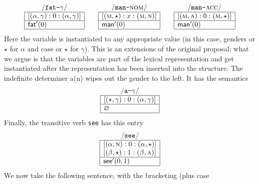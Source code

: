 $$
\begin{array}{|l|}
\multicolumn{1}{c}{/\mbox{\tt fat-}\gamma/} \\
\hline
\left[ \spr{\alpha}{\gamma} : 0 : \spr{\alpha}{\gamma}\right]
\\\hline
\mbox{\sf fat}'(0) \\\hline
\end{array} \qquad
\begin{array}{|l|}
\multicolumn{1}{c}{/\mbox{\tt man-}\mbox{\sc nom}/} \\
\hline
\left[ \spr{\ms}{\star} : x : \spr{\ms}{\nm}\right]
\\\hline
\mbox{\sf man}'(0) \\\hline
\end{array} \qquad
\begin{array}{|l|}
\multicolumn{1}{c}{/\mbox{\tt man-}\mbox{\sc acc}/} \\
\hline
\left[ \spr{\ms}{\ac} : 0 : \spr{\ms}{\star}\right]
\\\hline
\mbox{\sf man}'(0) \\\hline
\end{array}$$
Here the variable is instantiated to any appropriate value
(in this case, genders or $\star$ for $\alpha$ and case or
$\star$ for $\gamma$). This is an extensions of the original
proposal; what we argue is that the variables are part of the
lexical representation and get instantiated after the representation
has been inserted into the structure. The indefinite determiner
{\sf a(n)} wipes out the gender to the left. It has the
semantics
$$\begin{array}{|l|}
\multicolumn{1}{c}{/\mbox{\tt a-}\gamma/} \\
\hline
\left[ \spr{\star}{\gamma} : 0 : \spr{\alpha}{\gamma}\right]
\\\hline
\varnothing \\\hline
\end{array}$$
Finally, the transitive verb {\tt see} has this entry
$$\begin{array}{|l|}
\multicolumn{1}{c}{/\mbox{\tt see}/} \\
\hline
\left[ \spr{\alpha}{\nm} : 0 : \spr{\alpha}{\star}\right] \\
\left[ \spr{\beta}{\star} : 1 : \spr{\beta}{\ac} \right] \\
\hline
\mbox{\sf see}'(0,1) \\\hline
\end{array}$$
We now take the following sentence, with the  bracketing (plus case
